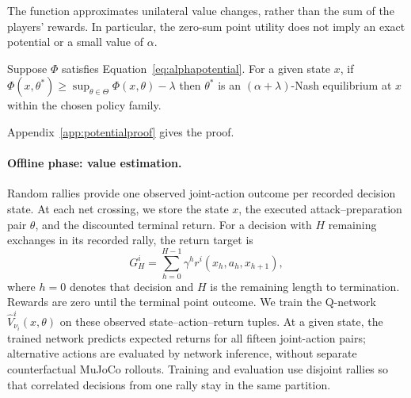 \documentclass[pmlr]{jmlr}
\begin{document}
The function approximates unilateral value changes, rather than the sum of the players' rewards. In particular, the zero-sum point utility does not imply an exact potential or a small value of $\alpha$.

\begin{proposition}
Suppose $\Phi$ satisfies Equation~\eqref{eq:alphapotential}. For a given state $x$, if
$\Phi(x,\theta^*)\geq\sup_{\theta\in\Theta}\Phi(x,\theta)-\lambda$
then $\theta^*$ is an $(\alpha+\lambda)$-Nash equilibrium at $x$ within the chosen policy family.
\label{prop:potential}
\end{proposition}
Appendix~\ref{app:potentialproof} gives the proof.

\paragraph{Offline phase: value estimation.}
Random rallies provide one observed joint-action outcome per recorded decision state. At each net crossing, we store the state $x$, the executed attack--preparation pair $\theta$, and the discounted terminal return. For a decision with $H$ remaining exchanges in its recorded rally, the return target is
\begin{equation}
  G_H^i=\sum_{h=0}^{H-1}\gamma^h
  r^i(x_h,a_h,x_{h+1}),
  \label{eq:rolloutreturn}
\end{equation}
where $h=0$ denotes that decision and $H$ is the remaining length to termination. Rewards are zero until the terminal point outcome. We train the Q-network $\widehat V^i_{\nu_i}(x,\theta)$ on these observed state--action--return tuples. At a given state, the trained network predicts expected returns for all fifteen joint-action pairs; alternative actions are evaluated by network inference, without separate counterfactual MuJoCo rollouts. Training and evaluation use disjoint rallies so that correlated decisions from one rally stay in the same partition.
\end{document}
